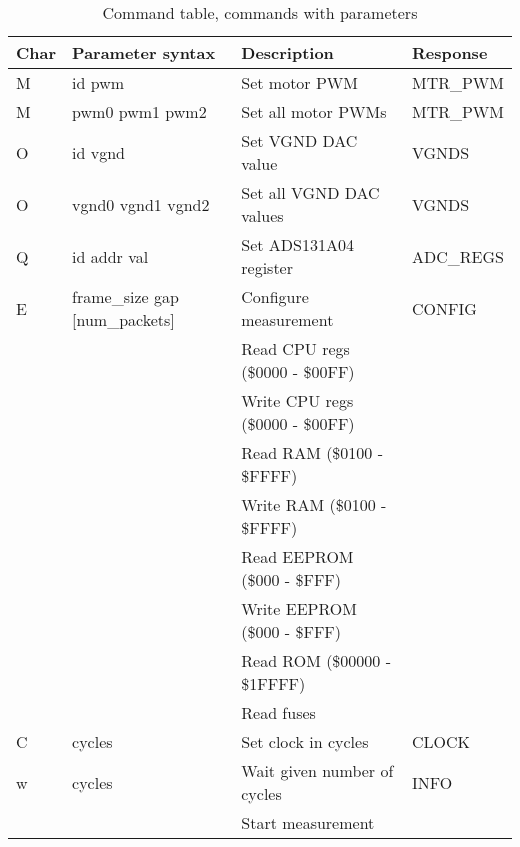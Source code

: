 \documentclass{article}
\begin{document}
\begin{table}[H]
\begin{centering}
\begin{tabular}{|p{0.8cm}|p{2.6cm}|p{4.9cm}|p{2.0cm}|}
\hline
{\bf Char} & {\bf Parameter syntax} & {\bf Description} & {\bf Response} \\ \hline
M & id pwm              & Set motor PWM                       & MTR\_PWM      \\ \hline
M & pwm0 pwm1 pwm2      & Set all motor PWMs                  & MTR\_PWM      \\ \hline
O & id vgnd             & Set VGND DAC value                  & VGNDS         \\ \hline
O & vgnd0 vgnd1 vgnd2   & Set all VGND DAC values             & VGNDS         \\ \hline
Q & id addr val         & Set ADS131A04 register              & ADC\_REGS     \\ \hline
E & frame\_size gap [num\_packets] & Configure measurement    & CONFIG        \\ \hline
  &                     & Read CPU regs (\$0000 - \$00FF)     &               \\ \hline
  &                     & Write CPU regs (\$0000 - \$00FF)    &               \\ \hline
  &                     & Read RAM (\$0100 - \$FFFF)          &               \\ \hline
  &                     & Write RAM (\$0100 - \$FFFF)         &               \\ \hline
  &                     & Read EEPROM (\$000 - \$FFF)         &               \\ \hline
  &                     & Write EEPROM (\$000 - \$FFF)        &               \\ \hline
  &                     & Read ROM (\$00000 - \$1FFFF)        &               \\ \hline
  &                     & Read fuses                          &               \\ \hline
C & cycles              & Set clock in cycles                 & CLOCK         \\ \hline
w & cycles              & Wait given number of cycles         & INFO          \\ \hline
  &                     & Start measurement                   &               \\ \hline
\end{tabular}
\caption{Command table, commands with parameters}
\label{command_table}
\end{centering}
\end{table}
\end{document}
